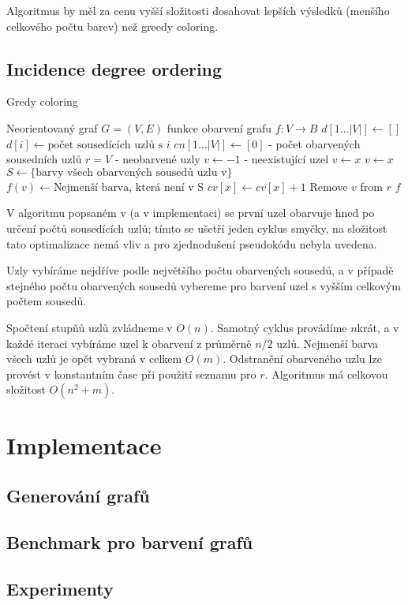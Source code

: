 \documentclass[12pt, a4paper]{article}
\begin{document}
Algoritmus by měl za cenu vyšší složitosti dosahovat lepších výsledků (menšího celkového počtu barev) než greedy coloring.

\subsection{Incidence degree ordering}
\begin{algorithm}
\caption{Gredy coloring} %
\label{Greedy coloring}
\begin{algorithmic}
\Input Neorientovaný graf $G = (V, E)$
\Output funkce obarvení grafu $f: 	V \rightarrow B$
\State $d[1 \dots |V|] \leftarrow []$
	\State $d[i] \leftarrow \text{počet sousedících uzlů s }i$
\EndFor
\State $cn[1 \dots |V|] \leftarrow [0]$ - počet obarvených sousedních uzlů
\State $r = V$ - neobarvené uzly
	\State $v \leftarrow -1$ - neexistující uzel
			\State $v \leftarrow x$
		\EndIf
			\State $v \leftarrow x$
		\EndIf
	\EndFor
	\State $S \leftarrow \{ \text{barvy všech obarvených sousedů uzlu v} \}$
	\State $f(v) \leftarrow \text{Nejmenší barva, která není v S}$
		\State $cv[x] \leftarrow cv[x] + 1$
	\EndFor
	\State Remove $v$ from $r$
\EndWhile
\State \Return $f$
\end{algorithmic}
\end{algorithm}

V algoritmu popsaném v \cite{ar4} (a v implementaci) se první uzel obarvuje hned po určení počtů sousedících uzlů; tímto se ušetří jeden cyklus smyčky,
na složitost tato optimalizace nemá vliv a pro zjednodušení pseudokódu nebyla uvedena.

Uzly vybíráme nejdříve podle největšího počtu obarvených sousedů, a v případě stejného počtu obarvených sousedů vybereme pro barvení uzel s vyšším celkovým počtem sousedů.

Spočtení stupňů uzlů zvládneme v $O(n)$.
Samotný cyklus provádíme $n$krát, a v každé iteraci vybíráme uzel k obarvení z průměrně $n / 2$ uzlů.
Nejmenší barva všech uzlů je opět vybraná v celkem $O(m)$.
Odstranění obarveného uzlu lze provést v konstantním čase při použití seznamu pro $r$.
Algoritmus má celkovou složitost $O(n^2 + m)$.

\section{Implementace}
\subsection{Generování grafů}
\subsection{Benchmark pro barvení grafů}

\subsection{Experimenty}
\end{document}
